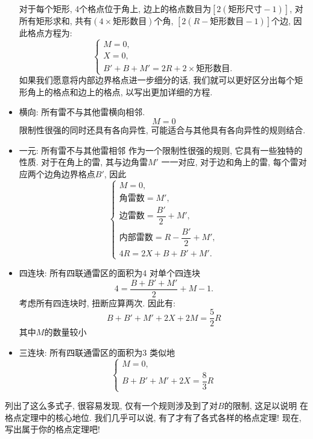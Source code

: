 \documentclass{ctexart}
\newcommand{\varible}[1]{{\Noto[#1]}}
\begin{document}
\begin{itemize}
    对于每个矩形, 4个格点位于角上, 边上的格点数目为$[2(\text{矩形尺寸}-1)]$, 对所有矩形求和, 共有$(4\times\text{矩形数目})$个角, $[2(R-\text{矩形数目}-1)]$个边, 因此格点方程为:
            $$
            \begin{cases}
                M = 0,\\
                X = 0,\\
                B' + B + M' = 2R + 2\times\text{矩形数目}.
            \end{cases}
            $$
    如果我们愿意将内部边界格点进一步细分的话, 我们就可以更好区分出每个矩形角上的格点和边上的格点, 以写出更加详细的方程.
    \item \varible{H} {\heiti 横向: 所有雷不与其他雷横向相邻.}
        $$
        M = 0
        $$
        限制性很强的同时还具有各向异性, 可能适合与其他具有各向异性的规则结合.
    \item \varible{U} {\heiti 一元: 所有雷不与其他雷相邻}
    作为一个限制性很强的规则, 它具有一些独特的性质. 对于在角上的雷, 其与边角雷$M'$ 一一对应, 对于边和角上的雷, 每个雷对应两个边角边界格点$B'$, 因此
        $$
        \begin{cases}
            M = 0,\\
            \text{角雷数} = M',\\
            \text{边雷数} = \dfrac{B'}{2} + M',\\
            \text{内部雷数} = R - \dfrac{B'}{2} + M',\\
            4R = 2X + B + B' + M'.
        \end{cases}
        $$
    \item \varible{2G} {\heiti 四连块: 所有四联通雷区的面积为4}
        对单个四连块
        $$
        4 = \frac{B + B' + M'}{2} + M - 1.
        $$
        考虑所有四连块时, 扭断应算两次. 因此有:
        $$
        B + B' + M' + 2X + 2M = \frac{5}{2}R 
        $$
        其中$M$的数量较小
    \item \varible{2G'} {\heiti 三连块: 所有四联通雷区的面积为3}
    类似地
    $$
    \begin{cases}
        M = 0,\\
        B + B' + M' + 2X = \dfrac{8}{3}R
    \end{cases}
    $$
\end{itemize}

列出了这么多式子, 很容易发现, 仅有\varible{Q}一个规则涉及到了对$B$的限制, 这足以说明\varible{Q} 在格点定理中的核心地位. 我们几乎可以说, 有了\varible{Q}才有了各式各样的格点定理! 现在, 写出属于你的格点定理吧!
\end{document}
